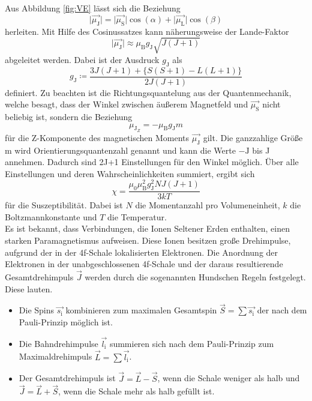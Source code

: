 Aus Abbildung \ref{fig:VE} lässt sich die Beziehung
\begin{equation}
    \lvert \vec{\mu_\text{J}} \rvert = \lvert \vec{\mu_\text{S}} \rvert \cos(\alpha) + \lvert \vec{\mu_\text{L}} \rvert \cos(\beta)
\end{equation}
herleiten. Mit Hilfe des Cosinussatzes kann näherungsweise der Lande-Faktor
\begin{equation}
    \lvert \vec{\mu_\text{J}} \rvert \approx \mu_\text{B} g_\text{J} \sqrt{J\left(J+1\right)}
\end{equation}
abgeleitet werden. Dabei ist der Ausdruck $g_\text{J}$ als
\begin{equation}
    g_\text{J} \coloneq \frac{3 J \left(J+1\right) + \{S\left(S+1\right)-L \left(L+1\right)\}}{2J\left(J+1\right)}
\end{equation}
definiert.
Zu beachten ist die Richtungsquantelung aus der Quantenmechanik, welche besagt, dass der Winkel zwischen äußerem Magnetfeld und $\vec{\mu_\text{S}}$
nicht beliebig ist, sondern die Beziehung
\begin{equation}
    \mu_{\text{J}_Z}=- \mu_\text{B} g_\text{J} m
\end{equation}
für die Z-Komponente des magnetischen Moments $\vec{\mu_\text{J}}$ gilt. Die ganzzahlige Größe m wird Orientierungsquantenzahl genannt und kann die Werte $-\text{J}$ bis J annehmen.
Dadurch sind 2J+1 Einstellungen für den Winkel möglich. 
Über alle Einstellungen und deren Wahrscheinlichkeiten summiert, ergibt sich
\begin{equation}
    \chi=\frac{\mu_0 \mu_\text{B}^2 g_\text{J}^2 N J \left(J+1\right)}{3 k T} \label{eqn:sustheo}
\end{equation}
für die Suszeptibilität. Dabei ist $N$ die Momentanzahl pro Volumeneinheit, $k$ die Boltzmannkonstante und $T$ die Temperatur.
\\
Es ist bekannt, dass Verbindungen, die Ionen Seltener Erden enthalten, einen starken Paramagnetismus aufweisen.
Diese Ionen besitzen große Drehimpulse, aufgrund der in der 4f-Schale lokalisierten Elektronen. 
Die Anordnung  der  Elektronen  in  der  unabgeschlossenen  4f-Schale  und  der  daraus  resultierende  Gesamtdrehimpuls  $\vec{J}$  werden  durch  die  sogenannten  Hundschen  Regeln  festgelegt.
Diese lauten.
\begin{itemize}
    \item Die Spins $\vec{s_\text{i}}$ kombinieren zum maximalen Gesamtspin $\vec{S}= \sum \vec{s_\text{i}}$ der nach dem Pauli-Prinzip möglich ist.
    \item Die Bahndrehimpulse $\vec{l_\text{i}}$ summieren sich nach dem Pauli-Prinzip zum Maximaldrehimpuls $\vec{L}=\sum \vec{l_\text{i}}$.
    \item Der Gesamtdrehimpuls ist $\vec{J}=\vec{L}-\vec{S}$, wenn die Schale weniger als halb und $\vec{J}=\vec{L}+\vec{S}$, wenn die Schale mehr als halb gefüllt ist.
\end{itemize}
